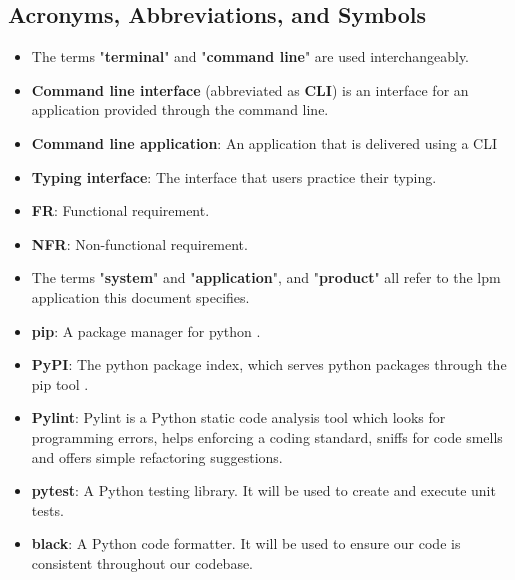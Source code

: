 \documentclass[12pt, titlepage]{article}
\begin{document}
\subsection{Acronyms, Abbreviations, and Symbols}

\begin{itemize}
    \item The terms "\textbf{terminal}" and "\textbf{command line}" are used interchangeably.
    \item \textbf{Command line interface} (abbreviated as \textbf{CLI}) is an interface for an application provided through the command line.
    \item \textbf{Command line application}: An application that is delivered using a CLI
    \item \textbf{Typing interface}: The interface that users practice their typing.
    \item \textbf{FR}: Functional requirement.
    \item \textbf{NFR}: Non-functional requirement.
    \item The terms "\textbf{system}" and "\textbf{application}", and "\textbf{product}" all refer to the lpm application this document specifies.
    \item \textbf{pip}: A package manager for python \citep{pip}.
    \item \textbf{PyPI}: The python package index, which serves python packages through the pip tool \citep{pypi}.
    \item \textbf{Pylint}: Pylint is a Python static code analysis tool which looks for programming errors, helps enforcing a coding standard, sniffs for code smells and offers simple refactoring suggestions.
    \item \textbf{pytest}: A Python testing library. It will be used to create and execute unit tests.
    \item \textbf{black}: A Python code formatter. It will be used to ensure our code is consistent throughout our codebase.
\end{itemize}


\end{document}
